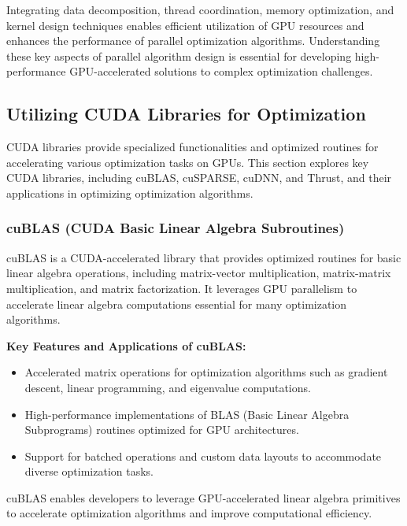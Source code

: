 \documentclass[11pt]{report}
\begin{document}
        Integrating data decomposition, thread coordination, memory optimization, and kernel design techniques enables efficient utilization of GPU resources and enhances the performance of parallel optimization algorithms. Understanding these key aspects of parallel algorithm design is essential for developing high-performance GPU-accelerated solutions to complex optimization challenges.

        \subsection{Utilizing CUDA Libraries for Optimization}
        CUDA libraries provide specialized functionalities and optimized routines for accelerating various optimization tasks on GPUs. This section explores key CUDA libraries, including cuBLAS, cuSPARSE, cuDNN, and Thrust, and their applications in optimizing optimization algorithms.

        
        \subsubsection{cuBLAS (CUDA Basic Linear Algebra Subroutines)}
        
        cuBLAS is a CUDA-accelerated library that provides optimized routines for basic linear algebra operations, including matrix-vector multiplication, matrix-matrix multiplication, and matrix factorization. It leverages GPU parallelism to accelerate linear algebra computations essential for many optimization algorithms.
        
        \textbf{Key Features and Applications of cuBLAS:}

        \begin{itemize}
            \item Accelerated matrix operations for optimization algorithms such as gradient descent, linear programming, and eigenvalue computations.
        
            \item High-performance implementations of BLAS (Basic Linear Algebra Subprograms) routines optimized for GPU architectures.
        
            \item Support for batched operations and custom data layouts to accommodate diverse optimization tasks.
        \end{itemize}
        
        cuBLAS enables developers to leverage GPU-accelerated linear algebra primitives to accelerate optimization algorithms and improve computational efficiency.
\end{document}
